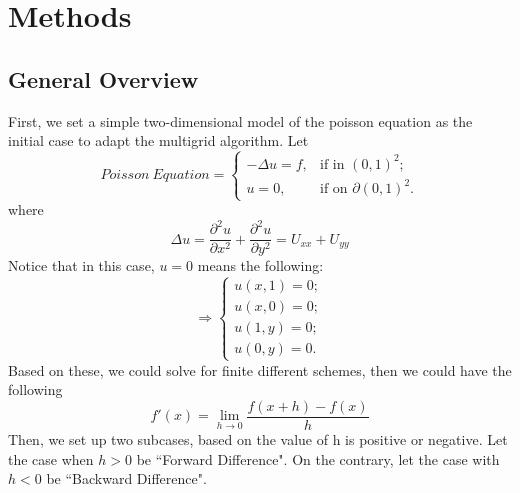 \documentclass [a4paper, 12pt]{article}
\begin{document}
\section {Methods}

\subsection {General Overview}

First, we set a simple two-dimensional model of the poisson equation as the initial case to adapt the multigrid algorithm. Let \\
\begin {equation}
       Poisson \ Equation=
       \begin {cases}
             -\Delta u=f,      &\text {if in $(0,1)^2$;} \\
             u=0,                 &\text {if on $\partial (0,1)^2$.} 
       \end {cases}
\end {equation}
where \\
\begin {equation}
      \Delta u=\frac {\partial^2 u}
                              {\partial x^2}
                      +
                      \frac {\partial^2 u}
                               {\partial y^2}
                      =U_{xx}+U_{yy}
\end {equation}
Notice that in this case, $u=0$ means the following: \\
\begin {equation}
      \Longrightarrow 
      \begin {cases}
            u(x,1)=0; \\
            u(x,0)=0; \\
            u(1,y)=0; \\
            u(0,y)=0.
      \end {cases}
\end {equation}
Based on these, we could solve for finite different schemes, then we could have the following \\
\begin {equation}
      f'(x)=\lim_{h \to 0} \frac {f(x+h)-f(x)}
                                              {h}
\end {equation}
Then, we set up two subcases, based on the value of h is positive or negative. Let the case when $h>0$ be ``Forward Difference". On the contrary, let the case with 
$h<0$ be ``Backward Difference". \\
\end{document}
